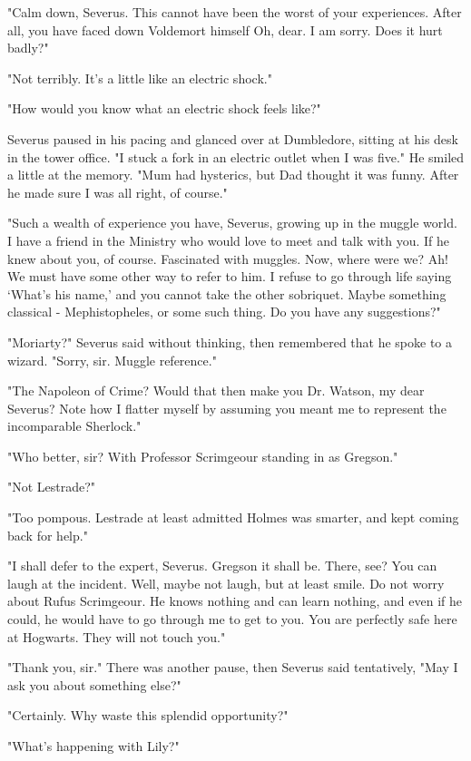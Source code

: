 "Calm down, Severus. This cannot have been the worst of your experiences. After all, you have faced down Voldemort himself{\el} Oh, dear. I am sorry. Does it hurt badly?"

"Not terribly. It's a little like an electric shock."

"How would you know what an electric shock feels like?"

Severus paused in his pacing and glanced over at Dumbledore, sitting at his desk in the tower office. "I stuck a fork in an electric outlet when I was five." He smiled a little at the memory. "Mum had hysterics, but Dad thought it was funny. After he made sure I was all right, of course."

"Such a wealth of experience you have, Severus, growing up in the muggle world. I have a friend in the Ministry who would love to meet and talk with you. If he knew about you, of course. Fascinated with muggles. Now, where were we? Ah! We must have some other way to refer to{\el} him. I refuse to go through life saying `What's his name,' and you cannot take the other sobriquet. Maybe something classical - Mephistopheles, or some such thing. Do you have any suggestions?"

"Moriarty?" Severus said without thinking, then remembered that he spoke to a wizard. "Sorry, sir. Muggle reference."

"The Napoleon of Crime? Would that then make you Dr. Watson, my dear Severus? Note how I flatter myself by assuming you meant me to represent the incomparable Sherlock."

"Who better, sir? With Professor Scrimgeour standing in as Gregson."

"Not Lestrade?"

"Too pompous. Lestrade at least admitted Holmes was smarter, and kept coming back for help."

"I shall defer to the expert, Severus. Gregson it shall be. There, see? You can laugh at the incident. Well, maybe not laugh, but at least smile. Do not worry about Rufus Scrimgeour. He knows nothing and can learn nothing, and even if he could, he would have to go through me to get to you. You are perfectly safe here at Hogwarts. They will not touch you."

"Thank you, sir." There was another pause, then Severus said tentatively, "May I ask you about something else?"

"Certainly. Why waste this splendid opportunity?"

"What's happening with Lily?"


